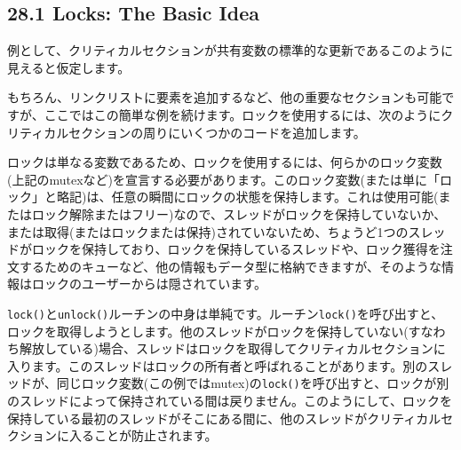 \hypertarget{locks-the-basic-idea}{%
\subsection*{28.1 Locks: The Basic Idea}\label{locks-the-basic-idea}}

例として、クリティカルセクションが共有変数の標準的な更新であるこのように見えると仮定します。

\begin{Shaded}
\begin{Highlighting}[]
\NormalTok{;}
\end{Highlighting}
\end{Shaded}

もちろん、リンクリストに要素を追加するなど、他の重要なセクションも可能ですが、ここではこの簡単な例を続けます。ロックを使用するには、次のようにクリティカルセクションの周りにいくつかのコードを追加します。

\begin{Shaded}
\begin{Highlighting}[]
\NormalTok{;}
\end{Highlighting}
\end{Shaded}

ロックは単なる変数であるため、ロックを使用するには、何らかのロック変数(上記のmutexなど)を宣言する必要があります。このロック変数(または単に「ロック」と略記)は、任意の瞬間にロックの状態を保持します。これは使用可能(またはロック解除またはフリー)なので、スレッドがロックを保持していないか、または取得(またはロックまたは保持)されていないため、ちょうど1つのスレッドがロックを保持しており、ロックを保持しているスレッドや、ロック獲得を注文するためのキューなど、他の情報もデータ型に格納できますが、そのような情報はロックのユーザーからは隠されています。

\texttt{lock()}と\texttt{unlock()}ルーチンの中身は単純です。ルーチン\texttt{lock()}を呼び出すと、ロックを取得しようとします。他のスレッドがロックを保持していない(すなわち解放している)場合、スレッドはロックを取得してクリティカルセクションに入ります。このスレッドはロックの所有者と呼ばれることがあります。別のスレッドが、同じロック変数(この例ではmutex)の\texttt{lock()}を呼び出すと、ロックが別のスレッドによって保持されている間は戻りません。このようにして、ロックを保持している最初のスレッドがそこにある間に、他のスレッドがクリティカルセクションに入ることが防止されます。

